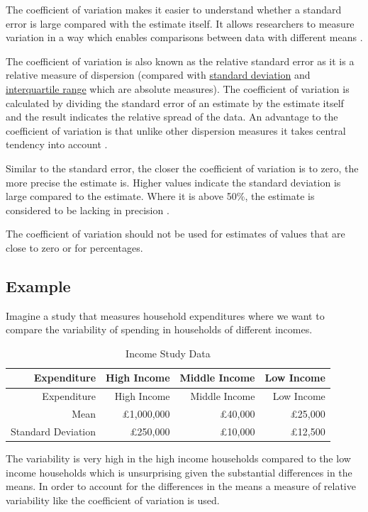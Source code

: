 \documentclass[
]{book}
\begin{document}
The coefficient of variation makes it easier to understand whether a standard error is large compared with the estimate itself. It allows researchers to measure variation in a way which enables comparisons between data with different means \citep{davidandgray}.

The coefficient of variation is also known as the relative standard error as it is a relative measure of dispersion (compared with \protect\hyperlink{stdv}{standard deviation} and \protect\hyperlink{iqr}{interquartile range} which are absolute measures). The coefficient of variation is calculated by dividing the standard error of an estimate by the estimate itself and the result indicates the relative spread of the data. An advantage to the coefficient of variation is that unlike other dispersion measures it takes central tendency into account \citep{davidandgray}.

Similar to the standard error, the closer the coefficient of variation is to zero, the more precise the estimate is. Higher values indicate the standard deviation is large compared to the estimate. Where it is above 50\%, the estimate is considered to be lacking in precision \citep{uncertainty}.

The coefficient of variation should not be used for estimates of values that are close to zero or for percentages.

\hypertarget{example}{%
\subsection{Example}\label{example}}

Imagine a study that measures household expenditures where we want to compare the variability of spending in households of different incomes.

\begin{longtable}[]{@{}rrrr@{}}
\caption{\label{tab:table0000} Income Study Data}\tabularnewline
\toprule
Expenditure & High Income & Middle Income & Low Income \\
\midrule
\endfirsthead
\toprule
Expenditure & High Income & Middle Income & Low Income \\
\midrule
\endhead
Mean & £1,000,000 & £40,000 & £25,000 \\
Standard Deviation & £250,000 & £10,000 & £12,500 \\
\bottomrule
\end{longtable}

The variability is very high in the high income households compared to the low income households which is unsurprising given the substantial differences in the means. In order to account for the differences in the means a measure of relative variability like the coefficient of variation is used.
\end{document}
